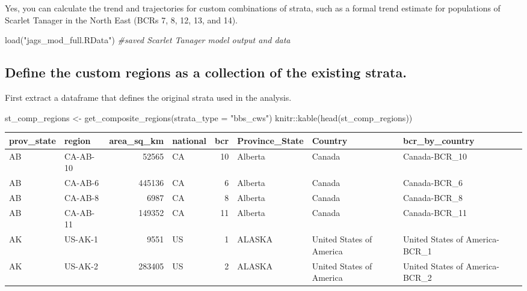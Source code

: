 \documentclass[
]{book}
\newenvironment{Shaded}{\begin{snugshade}}{\end{snugshade}}
\newcommand{\AttributeTok}[1]{\textcolor[rgb]{0.77,0.63,0.00}{#1}}
\newcommand{\CommentTok}[1]{\textcolor[rgb]{0.56,0.35,0.01}{\textit{#1}}}
\newcommand{\FunctionTok}[1]{\textcolor[rgb]{0.00,0.00,0.00}{#1}}
\newcommand{\NormalTok}[1]{#1}
\newcommand{\OtherTok}[1]{\textcolor[rgb]{0.56,0.35,0.01}{#1}}
\newcommand{\SpecialCharTok}[1]{\textcolor[rgb]{0.00,0.00,0.00}{#1}}
\newcommand{\StringTok}[1]{\textcolor[rgb]{0.31,0.60,0.02}{#1}}
\begin{document}
Yes, you can calculate the trend and trajectories for custom combinations of strata, such as a formal trend estimate for populations of Scarlet Tanager in the North East (BCRs 7, 8, 12, 13, and 14).

\begin{Shaded}
\begin{Highlighting}[]
\FunctionTok{load}\NormalTok{(}\StringTok{"jags\_mod\_full.RData"}\NormalTok{) }\CommentTok{\#saved Scarlet Tanager model output and data}
\end{Highlighting}
\end{Shaded}

\hypertarget{define-the-custom-regions-as-a-collection-of-the-existing-strata.}{%
\subsection{Define the custom regions as a collection of the existing strata.}\label{define-the-custom-regions-as-a-collection-of-the-existing-strata.}}

First extract a dataframe that defines the original strata used in the analysis.

\begin{Shaded}
\begin{Highlighting}[]
\NormalTok{st\_comp\_regions }\OtherTok{\textless{}{-}} \FunctionTok{get\_composite\_regions}\NormalTok{(}\AttributeTok{strata\_type =} \StringTok{"bbs\_cws"}\NormalTok{)}
\NormalTok{knitr}\SpecialCharTok{::}\FunctionTok{kable}\NormalTok{(}\FunctionTok{head}\NormalTok{(st\_comp\_regions))}
\end{Highlighting}
\end{Shaded}

\begin{tabular}{l|l|r|l|r|l|l|l}
\hline
prov\_state & region & area\_sq\_km & national & bcr & Province\_State & Country & bcr\_by\_country\\
\hline
AB & CA-AB-10 & 52565 & CA & 10 & Alberta & Canada & Canada-BCR\_10\\
\hline
AB & CA-AB-6 & 445136 & CA & 6 & Alberta & Canada & Canada-BCR\_6\\
\hline
AB & CA-AB-8 & 6987 & CA & 8 & Alberta & Canada & Canada-BCR\_8\\
\hline
AB & CA-AB-11 & 149352 & CA & 11 & Alberta & Canada & Canada-BCR\_11\\
\hline
AK & US-AK-1 & 9551 & US & 1 & ALASKA & United States of America & United States of America-BCR\_1\\
\hline
AK & US-AK-2 & 283405 & US & 2 & ALASKA & United States of America & United States of America-BCR\_2\\
\hline
\end{tabular}
\end{document}
